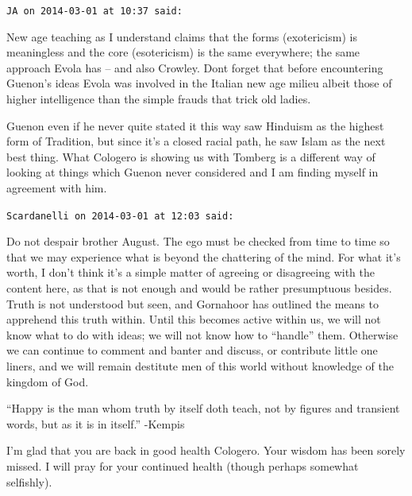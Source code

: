 \begin{footnotesize}
\begin{sffamily}
\hfill

\texttt{JA on 2014-03-01 at 10:37 said:}

New age teaching as I understand claims that the forms (exotericism) is meaningless and the core (esotericism) is the same everywhere; the same approach Evola has -- and also Crowley. Dont forget that before encountering Guenon's ideas Evola was involved in the Italian new age milieu albeit those of higher intelligence than the simple frauds that trick old ladies.

Guenon even if he never quite stated it this way saw Hinduism as the highest form of Tradition, but since it's a closed racial path, he saw Islam as the next best thing. What Cologero is showing us with Tomberg is a different way of looking at things which Guenon never considered and I am finding myself in agreement with him.

\hfill

\texttt{Scardanelli on 2014-03-01 at 12:03 said:}

Do not despair brother August. The ego must be checked from time to time so that we may experience what is beyond the chattering of the mind. For what it's worth, I don't think it's a simple matter of agreeing or disagreeing with the content here, as that is not enough and would be rather presumptuous besides. Truth is not understood but seen, and Gornahoor has outlined the means to apprehend this truth within. Until this becomes active within us, we will not know what to do with ideas; we will not know how to ``handle'' them. Otherwise we can continue to comment and banter and discuss, or contribute little one liners, and we will remain destitute men of this world without knowledge of the kingdom of God.

``Happy is the man whom truth by itself doth teach, not by figures and transient words, but as it is in itself.'' -Kempis

I'm glad that you are back in good health Cologero. Your wisdom has been sorely missed. I will pray for your continued health (though perhaps somewhat selfishly).


\hfill

\end{sffamily}
\end{footnotesize}


